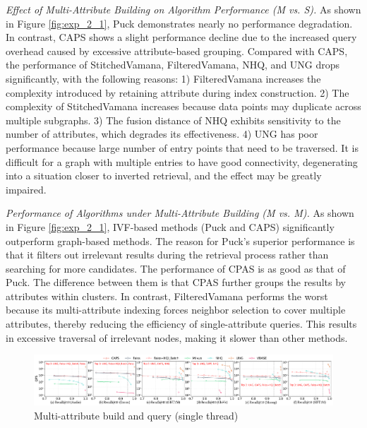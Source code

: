 \documentclass[sigconf, nonacm]{acmart}
\begin{document}
	\textit{Effect of Multi-Attribute Building on Algorithm Performance (M vs. S).}
	As shown in Figure \ref{fig:exp_2_1}, Puck demonstrates nearly no performance degradation. In contrast, CAPS shows a slight performance decline due to the increased query overhead caused by excessive attribute-based grouping. Compared with CAPS, the performance of StitchedVamana, FilteredVamana, NHQ, and UNG drops significantly, with the following reasons: 1) FilteredVamana increases the complexity introduced by retaining attribute during index construction. 2) The complexity of StitchedVamana increases because data points may duplicate across multiple subgraphs. 3) The fusion distance of NHQ exhibits sensitivity to the number of attributes, which degrades its effectiveness. 4) UNG has poor performance because large number of entry points that need to be traversed. It is difficult for a graph with multiple entries to have good connectivity, degenerating into a situation closer to inverted retrieval, and the effect may be greatly impaired.
	
	
	
	\textit{Performance of Algorithms under Multi-Attribute Building (M vs. M).}  
	As shown in Figure \ref{fig:exp_2_1}, IVF-based methods (Puck and CAPS) significantly outperform graph-based methods. The reason for Puck's superior performance is that it filters out irrelevant results during the retrieval process rather than searching for more candidates. The performance of CPAS is as good as that of Puck. The difference between them is that CPAS further groups the results by attributes within clusters. In contrast, FilteredVamana performs the worst because its multi-attribute indexing forces neighbor selection to cover multiple attributes, thereby reducing the efficiency of single-attribute queries. This results in excessive traversal of irrelevant nodes, making it slower than other methods.
	
	
	\begin{figure}
		\centering
		\setlength{\abovecaptionskip}{0.1cm}
		\setlength{\belowcaptionskip}{-0.4cm}
		\includegraphics[width=\textwidth]{figures/exp/exp_4_1_MultiLabel_1thread.pdf}
		\caption{Multi-attribute build and query (single thread)}
		\label{fig:exp_4_1_MultiLabel_1thread}
	\end{figure}
	
\end{document}
